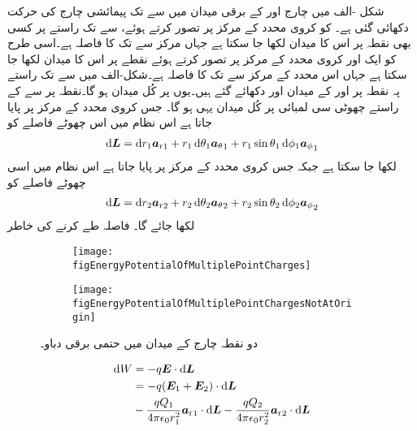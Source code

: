 شکل -الف میں چارج  اور  کے برقی میدان میں  سے  تک پیمائشی چارج  کی حرکت دکھائی گئی ہے۔ کو کروی محدد کے مرکز پر تصور کرتے ہوئے،  سے  تک راستے پر  کسی بھی نقطہ  پر اس کا میدان  لکھا جا سکتا ہے جہاں  مرکز سے   تک کا فاصلہ ہے۔اسی طرح  کو ایک اور کروی محدد کے مرکز پر تصور کرتے ہوئے  نقطے  پر اس کا میدان  لکھا جا سکتا ہے جہاں  اس محدد کے مرکز سے   تک کا فاصلہ ہے۔شکل-الف میں  سے  تک راستے پہ نقطہ  پر  اور  کے میدان  اور  دکھائے گئے ہیں۔یوں  پر کُل میدان  ہو گا۔نقطہ  پر  سے  کے راستے چھوٹی سی لمبائی    پر کُل میدان یہی ہو گا۔ جس کروی محدد کے مرکز پر  پایا جاتا ہے اس نظام میں اس چھوٹے فاصلے کو 
\begin{align}\label{مساوات_توانائی_چھوٹا_فاصلہ_الف}
\dif \kvec{L}=\dif r_1 {\ar}_1+r_1 \dif {\theta}_1 {\atheta}_1+r_1\sin \theta_1 \dif \phi_1 {\aphi}_1 
\end{align}
لکھا جا سکتا ہے جبکہ جس کروی محدد کے مرکز پر  پایا جاتا ہے اس نظام میں اسی چھوٹے فاصلے کو 
\begin{align}\label{مساوات_توانائی_چھوٹا_فاصلہ_ب}
\dif \kvec{L}=\dif r_2 {\ar}_2+r_2 \dif {\theta}_2 {\atheta}_2+r_2\sin \theta_2 \dif \phi_2 {\aphi}_2 
\end{align}
لکھا جائے گا۔ فاصلہ طے کرنے کی خاطر
\begin{figure}
\centering
\begin{subfigure}{0.5\textwidth}
\centering
\texttt{[image: figEnergyPotentialOfMultiplePointCharges]}
\end{subfigure}%
%
\begin{subfigure}{0.5\textwidth}
\centering
\texttt{[image: figEnergyPotentialOfMultiplePointChargesNotAtOrigin]}
\end{subfigure}%
\caption{دو نقطہ چارج کے میدان میں حتمی برقی دباو۔}
\label{شکل_توانائی_متعدد_نقطہ_چارج_دباو}
\end{figure}
%
\begin{align*}
\dif W&=-q \kvec{E} \cdot \dif \kvec{L}\\
&=-q (\kvec{E}_1+\kvec{E}_2) \cdot \dif \kvec{L}\\
&- \frac{q Q_1}{4\pi \epsilon_0 r_1^2} {\ar}_1 \cdot \dif \kvec{L}- \frac{q Q_2}{4\pi \epsilon_0 r_2^2} {\ar}_2 \cdot \dif \kvec{L}
\end{align*}
